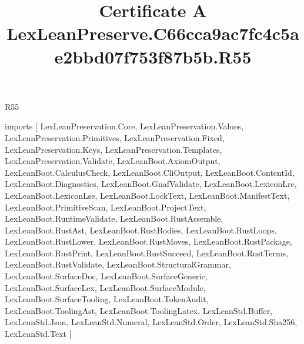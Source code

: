 \begin{lexlean}{R55}
\title{Certificate A LexLeanPreserve.C66cca9ac7fc4c5ae2bbd07f753f87b5b.R55}
\begin{coremodule}
imports [
  LexLeanPreservation.Core,
  LexLeanPreservation.Values,
  LexLeanPreservation.Primitives,
  LexLeanPreservation.Fixed,
  LexLeanPreservation.Keys,
  LexLeanPreservation.Templates,
  LexLeanPreservation.Validate,
  LexLeanBoot.AxiomOutput,
  LexLeanBoot.CalculusCheck,
  LexLeanBoot.CliOutput,
  LexLeanBoot.ContentId,
  LexLeanBoot.Diagnostics,
  LexLeanBoot.GnafValidate,
  LexLeanBoot.LexiconLre,
  LexLeanBoot.LexiconLse,
  LexLeanBoot.LockText,
  LexLeanBoot.ManifestText,
  LexLeanBoot.PrimitiveScan,
  LexLeanBoot.ProjectText,
  LexLeanBoot.RuntimeValidate,
  LexLeanBoot.RustAssemble,
  LexLeanBoot.RustAst,
  LexLeanBoot.RustBodies,
  LexLeanBoot.RustLoops,
  LexLeanBoot.RustLower,
  LexLeanBoot.RustMoves,
  LexLeanBoot.RustPackage,
  LexLeanBoot.RustPrint,
  LexLeanBoot.RustSucceed,
  LexLeanBoot.RustTerms,
  LexLeanBoot.RustValidate,
  LexLeanBoot.StructuralGrammar,
  LexLeanBoot.SurfaceDoc,
  LexLeanBoot.SurfaceGeneric,
  LexLeanBoot.SurfaceLex,
  LexLeanBoot.SurfaceModule,
  LexLeanBoot.SurfaceTooling,
  LexLeanBoot.TokenAudit,
  LexLeanBoot.ToolingAst,
  LexLeanBoot.ToolingLatex,
  LexLeanStd.Buffer,
  LexLeanStd.Json,
  LexLeanStd.Numeral,
  LexLeanStd.Order,
  LexLeanStd.Sha256,
  LexLeanStd.Text
]


\end{coremodule}
\end{lexlean}
